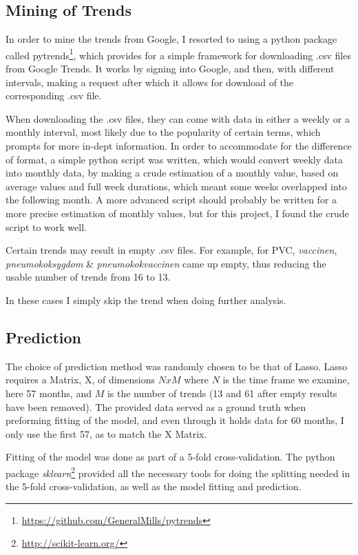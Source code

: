 \documentclass{sig-alternate}
\begin{document}
\subsection{Mining of Trends}
In order to mine the trends from Google, I resorted to using a python package called pytrends\footnote{\url{https://github.com/GeneralMills/pytrends}}, which provides for a simple framework for downloading .csv files from Google Trends. It works by signing into Google, and then, with different intervals, making a request after which it allows for download of the corresponding .csv file.

When downloading the .csv files, they can come with data in either a weekly or a monthly interval, most likely due to the popularity of certain terms, which prompts for more in-dept information. In order to accommodate for the difference of format, a simple python script was written, which would convert weekly data into monthly data, by making a crude estimation of a monthly value, based on average values and full week durations, which meant some weeks overlapped into the following month. A more advanced script should probably be written for a more precise estimation of monthly values, but for this project, I found the crude script to work well.

Certain trends may result in empty .csv files. For example, for PVC, \textit{vaccinen}, \textit{pneumokoksygdom} \& \textit{pneumokokvaccinen} came up empty, thus reducing the usable number of trends from 16 to 13.

 In these cases I simply skip the trend when doing further analysis.

\subsection{Prediction}
The choice of prediction method was randomly chosen to be that of Lasso. Lasso requires a Matrix, X, of dimensions $NxM$ where $N$ is the time frame we examine, here 57 months, and $M$ is the number of trends (13 and 61 after empty results have been removed). The provided data served as a ground truth  when preforming fitting of the model, and even through it holds data for 60 months, I only use the first 57, as to match the X Matrix.

Fitting of the model was done as part of a 5-fold cross-validation. The python package \textit{sklearn}\footnote{\url{http://scikit-learn.org/}} provided all the necessary tools for doing the splitting needed in the 5-fold cross-validation, as well as the model fitting and prediction.
\end{document}
